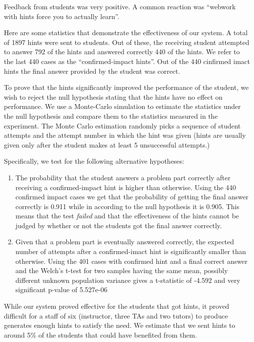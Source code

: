 \documentclass{sigchi}
\begin{document}
Feedback from students was very positive. A common reaction was
``webwork with hints force you to actually learn''.

Here are some statistics that demonstrate the effectiveness of our
system. A total of 1897 hints were sent to students. Out of
these, the receiving student attempted to answer 792 of the hints and
answered correctly 440 of the hints. We refer to the last 440 cases as
the ``confirmed-impact hints''. Out of the 440 cinfirmed imact hints
the final answer provided by the student was correct.

To prove that the hints significantly improved the performance of the
student, we wish to reject the null hypothesis stating that the hints
have no effect on performance. We use a Monte-Carlo simulation to
estimate the statistics under the null hypothesis and compare them to
the statistics measured in the experiment. The Monte Carlo estimation
randomly picks a sequence of student attempts and the attempt number
in which the hint was given (hints are usually given only after the
student makes at least 5 unsuccessful attempts.)

Specifically, we test for the following alternative hypotheses:
\begin{enumerate}
\item The probability that the student answers a problem part
  correctly after receiving a confirmed-impact hint is higher than
  otherwise. Using the 440 confirmed impact cases we get that the
  probability of getting the final answer correctly is 0.911 while in
  according to the null hypothesis it is 0.905. This means that the
  test {\em failed} and that the effectiveness of the hints cannot be
  judged by whether or not the students got the final answer
  correctly.
\item Given that a problem part is eventually answered correctly, the
  expected number of attempts after a confirmed-imact hint is
  significantly smaller than otherwise. Using the 401 cases with
  confirmed hint and a final correct answer and the Welch's t-test 
  for two samples having the same mean, possibly different unknown 
  population variance gives a t-statistic of -4.592 and very
  significant p-value of 5.527e-06
\end{enumerate}

While our system proved effective for the students that got hints, it
proved difficult for a staff of six (instructor, three TAs and two
tutors) to produce generates enough hints to satisfy the need. We
estimate that we sent hints to around 5\% of the students that could
have benefited from them.
\end{document}

